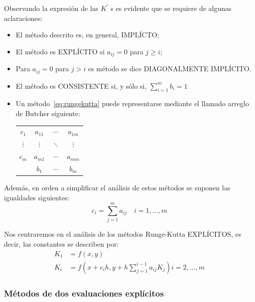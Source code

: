 Observando la expresión de las $K^{\prime}$ s es evidente que se requiere de algunas aclaraciones:
\begin{itemize}
    \item
          El método descrito es, en general, IMPLÍCTO;
    \item
          El método es EXPLÍCITO si $a_{i j}=0$ para $j \geq i$;
    \item
          Para $a_{i j}=0$ para $j>i$ es método se dice DIAGONALMENTE IMPLÍCITO.
    \item
          El método es CONSISTENTE si, y sólo si, $\sum_{i=1}^m b_i=1$
    \item
          Un método~\eqref{eq:rungekutta} puede representarse mediante el llamado arreglo de Butcher siguiente:
          \begin{table}[ht!]
              \centering
              \begin{tabular}{c|ccc}
                  $c_1$    & $a_{11}$  & $\cdots$ & $a_{1 m}$ \\
                  $\vdots$ & $\vdots$  & $\ddots$ & $\vdots$  \\
                  $c_m$    & $a_{m 1}$ & $\cdots$ & $a_{m m}$ \\
                  \hline   & $b_1$     & $\cdots$ & $b_m$
              \end{tabular}
          \end{table}
\end{itemize}
Además, en orden a simplificar el análisis de estos métodos se suponen las igualdades siguientes:
\begin{equation}\label{eq:coefficients}
    c_i=\sum_{j=1}^m a_{i j} \quad i=1, \ldots, m
\end{equation}

Nos centraremos en el análisis de los métodos Runge-Kutta EXPLÍCITOS, es decir, las constantes se describen por:
\begin{align*}
    K_1 & =f(x, y)                                                                \\
    K_i & =f\left(x+c_i h, y+h \sum_{j=1}^{i-1} a_{i j} K_j\right) i=2, \ldots, m
\end{align*}

\subsubsection{Métodos de dos evaluaciones explícitos}

